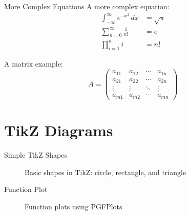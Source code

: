 \documentclass{beamer}
\begin{document}
\begin{frame}{More Complex Equations}
  A more complex equation:
  \begin{align}
    \int_{-\infty}^{\infty} e^{-x^2} \, dx &= \sqrt{\pi} \\
    \sum_{n=0}^{\infty} \frac{1}{n!} &= e \\
    \prod_{i=1}^{n} i &= n!
  \end{align}
  
  A matrix example:
  \begin{equation}
    A = \begin{pmatrix}
      a_{11} & a_{12} & \cdots & a_{1n} \\
      a_{21} & a_{22} & \cdots & a_{2n} \\
      \vdots & \vdots & \ddots & \vdots \\
      a_{m1} & a_{m2} & \cdots & a_{mn}
    \end{pmatrix}
  \end{equation}
\end{frame}

\section{TikZ Diagrams}

\begin{frame}{Simple TikZ Shapes}
  \begin{figure}
    \centering
    \caption{Basic shapes in TikZ: circle, rectangle, and triangle}
  \end{figure}
\end{frame}

\begin{frame}{Function Plot}
  \begin{figure}
    \centering
    \caption{Function plots using PGFPlots}
  \end{figure}
\end{frame}
\end{document}

